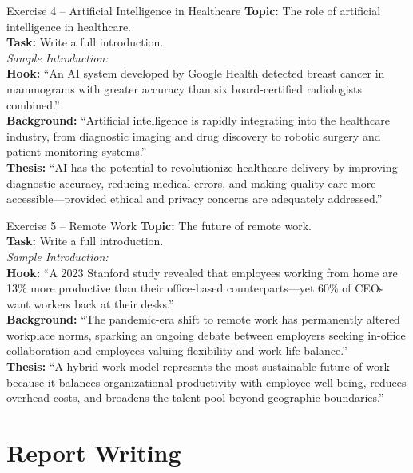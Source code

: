 \documentclass[12pt,a4paper]{article}
\begin{document}
\begin{practicebox}{Exercise 4 -- Artificial Intelligence in Healthcare}
\textbf{Topic:} The role of artificial intelligence in healthcare.\\
\textbf{Task:} Write a full introduction.\\[0.3cm]
\textit{Sample Introduction:}\\
\textbf{Hook:} ``An AI system developed by Google Health detected breast cancer in mammograms with greater accuracy than six board-certified radiologists combined.''\\
\textbf{Background:} ``Artificial intelligence is rapidly integrating into the healthcare industry, from diagnostic imaging and drug discovery to robotic surgery and patient monitoring systems.''\\
\textbf{Thesis:} ``AI has the potential to revolutionize healthcare delivery by improving diagnostic accuracy, reducing medical errors, and making quality care more accessible---provided ethical and privacy concerns are adequately addressed.''
\end{practicebox}

\begin{practicebox}{Exercise 5 -- Remote Work}
\textbf{Topic:} The future of remote work.\\
\textbf{Task:} Write a full introduction.\\[0.3cm]
\textit{Sample Introduction:}\\
\textbf{Hook:} ``A 2023 Stanford study revealed that employees working from home are 13\% more productive than their office-based counterparts---yet 60\% of CEOs want workers back at their desks.''\\
\textbf{Background:} ``The pandemic-era shift to remote work has permanently altered workplace norms, sparking an ongoing debate between employers seeking in-office collaboration and employees valuing flexibility and work-life balance.''\\
\textbf{Thesis:} ``A hybrid work model represents the most sustainable future of work because it balances organizational productivity with employee well-being, reduces overhead costs, and broadens the talent pool beyond geographic boundaries.''
\end{practicebox}

\newpage

\section{Report Writing}
\end{document}
